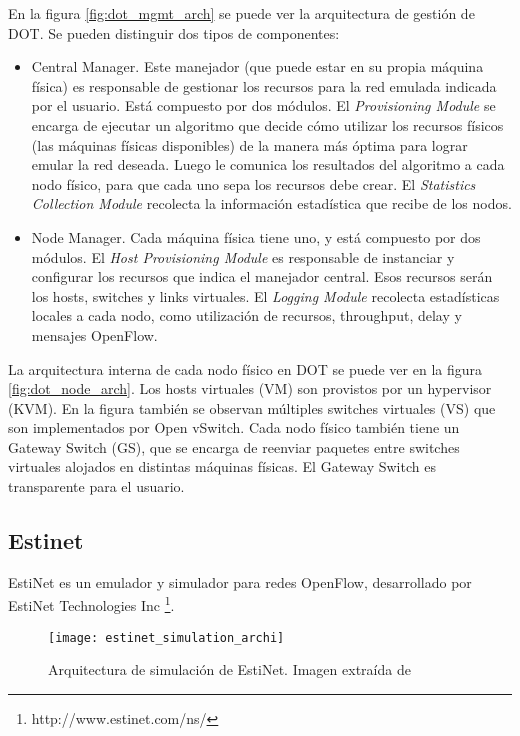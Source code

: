 En la figura \ref{fig:dot_mgmt_arch} se puede ver la arquitectura de gestión de DOT. Se pueden distinguir dos tipos de componentes:
\begin{itemize}
	\item Central Manager. Este manejador (que puede estar en su propia máquina física) es responsable de gestionar los recursos para la red emulada indicada por el usuario. Está compuesto por dos módulos. El \textit{Provisioning Module} se encarga de ejecutar un algoritmo que decide cómo utilizar los recursos físicos (las máquinas físicas disponibles) de la manera más óptima para lograr emular la red deseada. Luego le comunica los resultados del algoritmo a cada nodo físico, para que cada uno sepa los recursos debe crear. El \textit{Statistics Collection Module} recolecta la información estadística que recibe de los nodos.
	\item Node Manager. Cada máquina física tiene uno, y está compuesto por dos módulos. El \textit{Host Provisioning Module} es responsable de instanciar y configurar los recursos que indica el manejador central. Esos recursos serán los hosts, switches y links virtuales. El \textit{Logging Module} recolecta estadísticas locales a cada nodo, como utilización de recursos, throughput, delay y mensajes OpenFlow.
\end{itemize}

La arquitectura interna de cada nodo físico en DOT se puede ver en la figura \ref{fig:dot_node_arch}. Los hosts virtuales (VM) son provistos por un hypervisor (KVM). En la figura también se observan múltiples switches virtuales (VS) que son implementados por Open vSwitch. Cada nodo físico también tiene un Gateway Switch (GS), que se encarga de reenviar paquetes entre switches virtuales alojados en distintas máquinas físicas. El Gateway Switch es transparente para el usuario.

\subsection{Estinet}
EstiNet \cite{estinet} es un emulador y simulador para redes OpenFlow, desarrollado por EstiNet Technologies Inc \footnote{http://www.estinet.com/ns/}.

\begin{figure}[t]
	\caption{Arquitectura de simulación de EstiNet. Imagen extraída de \cite{estinet}}
	\texttt{[image: estinet\_simulation\_archi]}
	\centering
	\label{fig:estinet_simulation_archi}
\end{figure}

